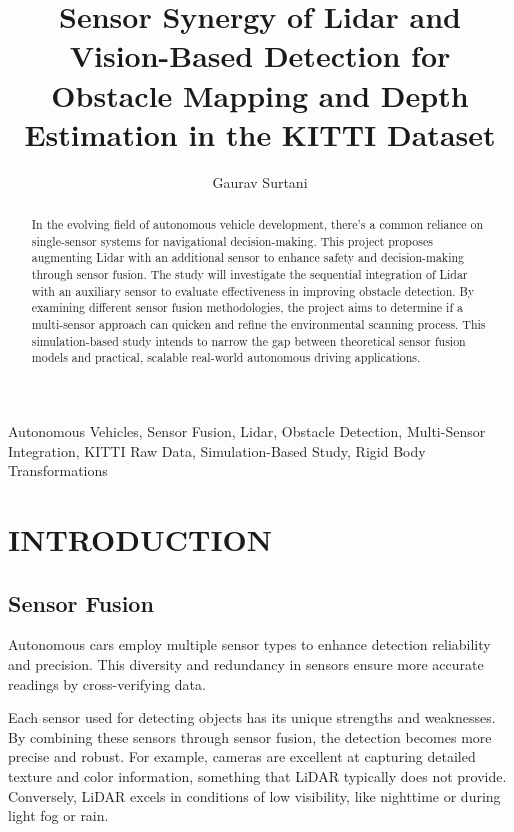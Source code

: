 \documentclass[letterpaper, 10 pt, conference]{ieeeconf}  %
\title{\LARGE \bf
Sensor Synergy of Lidar and Vision-Based Detection for Obstacle Mapping and Depth Estimation in the KITTI Dataset
}
\author{Gaurav Surtani}
\begin{document}
\maketitle
\thispagestyle{empty}
\pagestyle{empty}


\begin{abstract}

In the evolving field of autonomous vehicle development, there's a common reliance on single-sensor systems for navigational decision-making. This project proposes augmenting Lidar with an additional sensor to enhance safety and decision-making through sensor fusion. The study will investigate the sequential integration of Lidar with an auxiliary sensor to evaluate effectiveness in improving obstacle detection. By examining different sensor fusion methodologies, the project aims to determine if a multi-sensor approach can quicken and refine the environmental scanning process. This simulation-based study intends to narrow the gap between theoretical sensor fusion models and practical, scalable real-world autonomous driving applications.

\end{abstract}

\begin{keywords}
Autonomous Vehicles, Sensor Fusion, Lidar, Obstacle Detection, Multi-Sensor Integration, KITTI Raw Data, Simulation-Based Study, Rigid Body Transformations
\end{keywords}


\section{INTRODUCTION}

\subsection{Sensor Fusion}
Autonomous cars employ multiple sensor types to enhance detection reliability and precision. This diversity and redundancy in sensors ensure more accurate readings by cross-verifying data. 

Each sensor used for detecting objects has its unique strengths and weaknesses. By combining these sensors through sensor fusion, the detection becomes more precise and robust. For example, cameras are excellent at capturing detailed texture and color information, something that LiDAR typically does not provide. Conversely, LiDAR excels in conditions of low visibility, like nighttime or during light fog or rain. \cite{NVIDIA}
\end{document}
